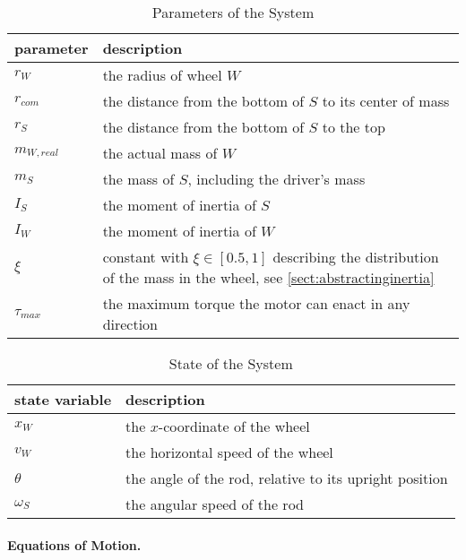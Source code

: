 \documentclass[copyright,submission]{eptcs}
\newcommand{\mi}[1]{\mathit{#1}}
\begin{document}
\begin{table}
     \centering\begin{tabu} to 0.9\linewidth {X[1]X[5]}
        \toprule
        \rowfont{\bfseries} parameter & description \\\midrule
        $r_W$ & the radius of wheel $W$ \\
        $r_\mi{com}$ & the distance from the bottom of $S$ to its center of mass \\
        $r_S$ & the distance from the bottom of $S$ to the top \\
        $m_{W, \mi{real}}$ & the actual mass of $W$ \\
        $m_S$ & the mass of $S$, including the driver's mass \\
        $I_S$ & the moment of inertia of $S$ \\
        $I_W$ & the moment of inertia of $W$ \\
        $\xi$ & constant with $\xi \in [0.5, 1]$ describing the distribution of the mass in the wheel, see \cref{sect:abstractinginertia} \\
        $\tau_\mi{max}$ & the maximum torque the motor can enact in any direction \\
        \bottomrule
    \end{tabu}
    \caption{\label{tbl:model-parameters} Parameters of the System}
\end{table}

\begin{table}
     \centering\begin{tabu} to 0.9\linewidth {X[1.5]X[5]}
        \toprule
        \rowfont{\bfseries} state variable & description \\\midrule
        $x_W$ & the $x$-coordinate of the wheel \\
        $v_W$ & the horizontal speed of the wheel \\
        $\theta$ & the angle of the rod, relative to its upright position \\
        $\omega_S$ & the angular speed of the rod \\
        \bottomrule
    \end{tabu}
    \caption{\label{tbl:model-state} State of the System}
\end{table}


\paragraph{Equations of Motion.}
\end{document}
